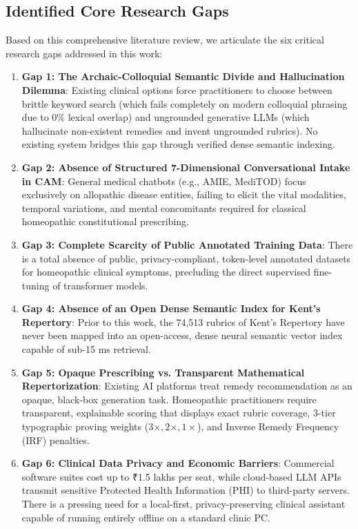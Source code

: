 \begin{sloppypar}
\subsection{Identified Core Research Gaps}
Based on this comprehensive literature review, we articulate the six critical research gaps addressed in this work:
\begin{enumerate}
    \item \textbf{Gap 1: The Archaic-Colloquial Semantic Divide and Hallucination Dilemma}: Existing clinical options force practitioners to choose between brittle keyword search (which fails completely on modern colloquial phrasing due to 0\% lexical overlap) and ungrounded generative LLMs (which hallucinate non-existent remedies and invent ungrounded rubrics). No existing system bridges this gap through verified dense semantic indexing.
    \item \textbf{Gap 2: Absence of Structured 7-Dimensional Conversational Intake in CAM}: General medical chatbots (e.g., AMIE, MediTOD) focus exclusively on allopathic disease entities, failing to elicit the vital modalities, temporal variations, and mental concomitants required for classical homeopathic constitutional prescribing.
    \item \textbf{Gap 3: Complete Scarcity of Public Annotated Training Data}: There is a total absence of public, privacy-compliant, token-level annotated datasets for homeopathic clinical symptoms, precluding the direct supervised fine-tuning of transformer models.
    \item \textbf{Gap 4: Absence of an Open Dense Semantic Index for Kent's Repertory}: Prior to this work, the 74,513 rubrics of Kent's Repertory have never been mapped into an open-access, dense neural semantic vector index capable of sub-15 ms retrieval.
    \item \textbf{Gap 5: Opaque Prescribing vs. Transparent Mathematical Repertorization}: Existing AI platforms treat remedy recommendation as an opaque, black-box generation task. Homeopathic practitioners require transparent, explainable scoring that displays exact rubric coverage, 3-tier typographic proving weights ($3\times, 2\times, 1\times$), and Inverse Remedy Frequency (IRF) penalties.
    \item \textbf{Gap 6: Clinical Data Privacy and Economic Barriers}: Commercial software suites cost up to ₹1.5 lakhs per seat, while cloud-based LLM APIs transmit sensitive Protected Health Information (PHI) to third-party servers. There is a pressing need for a local-first, privacy-preserving clinical assistant capable of running entirely offline on a standard clinic PC.
\end{enumerate}

\end{sloppypar}
